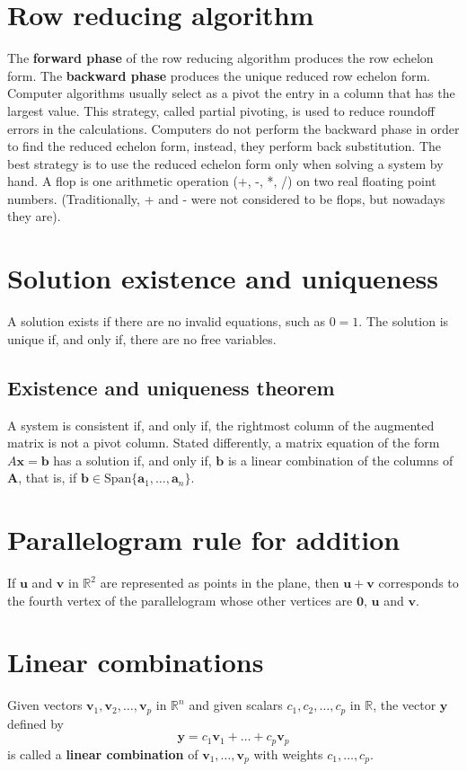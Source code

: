 \documentclass[12pt, oneside]{book}
\begin{document}
\section{Row reducing algorithm}
The \textbf{forward phase} of the row reducing algorithm produces the row
echelon form.
The \textbf{backward phase} produces the unique reduced row echelon form.
Computer algorithms usually select as a pivot the entry in a column that has the
largest value.
This strategy, called partial pivoting, is used to reduce roundoff errors in the
calculations.
Computers do not perform the backward phase in order to find the reduced echelon
form, instead,
they perform back substitution.
The best strategy is to use the reduced echelon form only when solving a system
by hand.
A flop is one arithmetic operation (+, -, *, /) on two real floating point
numbers.
(Traditionally, + and - were not considered to be flops, but nowadays they are).

\section{Solution existence and uniqueness}
A solution exists if there are no invalid equations, such as \( 0 = 1 \). The
solution is unique if, and only if, there are no free variables.

\subsection{Existence and uniqueness theorem}
A system is consistent if, and only if, the rightmost column of the augmented
matrix is not a pivot column.
Stated differently, a matrix equation of the form \(A\mathbf{x} = \mathbf{b}\)
has a solution if, and only if, \(\mathbf{b}\) is a linear combination of the
columns of \(\mathbf{A}\), that is, if \(\mathbf{b} \in \mathrm{Span}
\{\mathbf{a}_1, \ldots, \mathbf{a}_n\}\).

\section{Parallelogram rule for addition}
If \(\mathbf{u}\) and \(\mathbf{v}\) in \(\mathbb{R}^2\)
are represented as points in the plane,
then \(\mathbf{u} + \mathbf{v}\) corresponds to the fourth vertex of the
parallelogram whose other vertices are \(\mathbf{0}\), \(\mathbf{u}\) and
\(\mathbf{v}\).

\section{Linear combinations}
Given vectors \(\mathbf{v}_1, \mathbf{v}_2, \ldots, \mathbf{v}_p\) in
\(\mathbb{R}^n\) and given scalars \(c_1, c_2, \ldots, c_p\) in \(\mathbb{R}\),
the vector \(\mathbf{y}\) defined by
\[ \mathbf{y} = c_1 \mathbf{v}_1 + \ldots + c_p \mathbf{v}_p \]
is called a \textbf{linear combination} of
\(\mathbf{v}_1, \ldots, \mathbf{v}_p\) with weights \(c_1, \ldots, c_p\).
\end{document}
